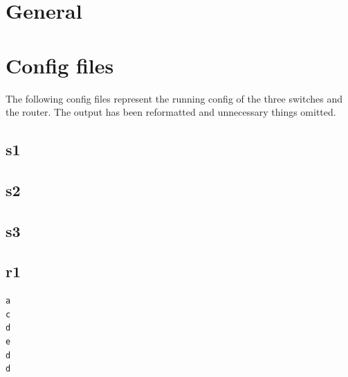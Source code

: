 \documentclass[
a4paper,     %
11pt         %
]{scrartcl}  %
\begin{document}
\section{General}

%

\section{Config files}

The following config files represent the running config of the three switches and the router. The output has been reformatted and unnecessary things omitted.

\subsection{s1}

\subsection{s2}

\subsection{s3}

\subsection{r1}

\begin{lstlisting}
a
c
d
e
d
d
\end{lstlisting}

\newpage
\listoffigures
\end{document}
